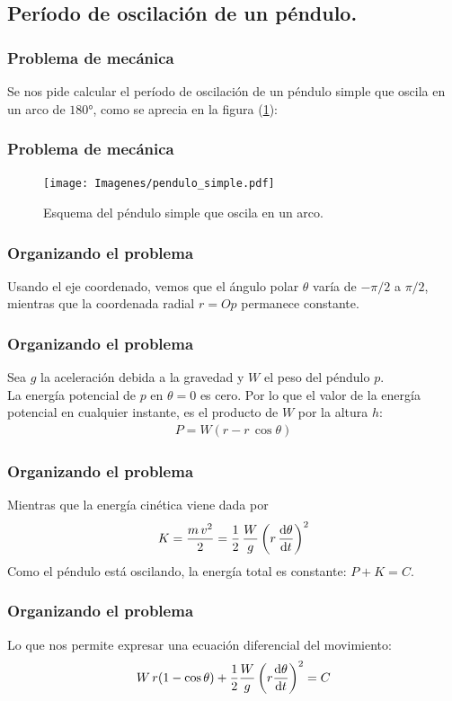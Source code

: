 \documentclass[12pt]{beamer}
\begin{document}
\subsection{Período de oscilación de un péndulo.}
\begin{frame}
\frametitle{Problema de mecánica}
Se nos pide calcular el período de oscilación de un péndulo simple que oscila en un arco de $\ang{180}$, como se aprecia en la figura (\ref{fig:figura_pendulo_simple}):
\end{frame}
\begin{frame}
\frametitle{Problema de mecánica}
\begin{figure}[!ht]
    \centering
    \texttt{[image: Imagenes/pendulo\_simple.pdf]}
    \caption{Esquema del péndulo simple que oscila en un arco.}
    \label{fig:figura_pendulo_simple}
\end{figure}
\end{frame}
\begin{frame}
\frametitle{Organizando el problema}
Usando el eje coordenado, vemos que el ángulo polar $\theta$ varía de $-\pi/2$ a $\pi/2$, mientras que la coordenada radial $r = Op$ permanece constante.
\end{frame}
\begin{frame}
\frametitle{Organizando el problema}
Sea $g$ la aceleración debida a la gravedad y $W$ el peso del péndulo $p$.
\\
\bigskip
\pause
La energía potencial de $p$ en $\theta = 0$ es cero. Por lo que el valor de la energía potencial en cualquier instante, es el producto de $W$ por la altura $h$:
\begin{align*}
P = W (r - r \, \cos \theta)
\end{align*}
\end{frame}
\begin{frame}
\frametitle{Organizando el problema}
Mientras que la energía cinética viene dada por
\begin{align*}
K = \dfrac{m \, v^{2}}{2} = \dfrac{1}{2} \, \dfrac{W}{g} \left( r \, \dv{\theta}{t} \right)^{2}
\end{align*}
Como el péndulo está oscilando, la energía total es constante: $P + K = C$.
\end{frame}
\begin{frame}
\frametitle{Organizando el problema}
Lo que nos permite expresar una ecuación diferencial del movimiento:
\begin{align*}
W \, r (1 - \cos \theta) + \dfrac{1}{2} \dfrac{W}{g} \left( r \dv{\theta}{t} \right)^{2} = C
\end{align*}
\end{frame}
\end{document}
